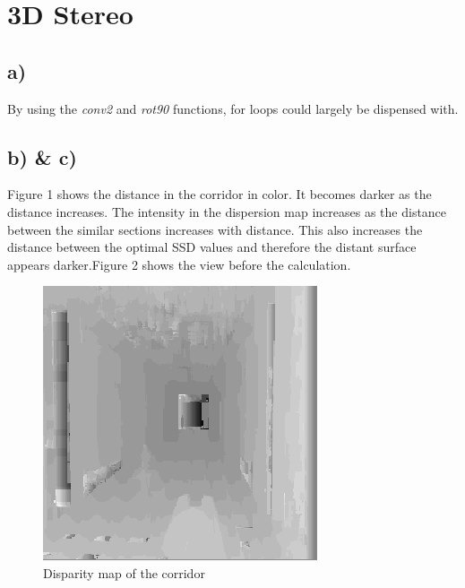\documentclass{article}
\begin{document}
	\section{3D Stereo}

	\subsection{a)} 
	By using the \textit{conv2} and \textit{rot90} functions, for loops could largely be dispensed with. 
	
	
	\subsection{b) \& c)}
	Figure 1 shows the distance in the corridor in color. It becomes darker as the distance increases. 
	The intensity in the dispersion map increases as the distance between the similar sections increases with distance. This also increases the distance between the optimal SSD values and therefore the distant surface appears darker.Figure 2 shows the view before the calculation.
	\begin{figure}[!h]
		\center
		\caption{Disparity map of the corridor}
		\includegraphics{corridor_disp.png}
		
	\end{figure}
\end{document}
